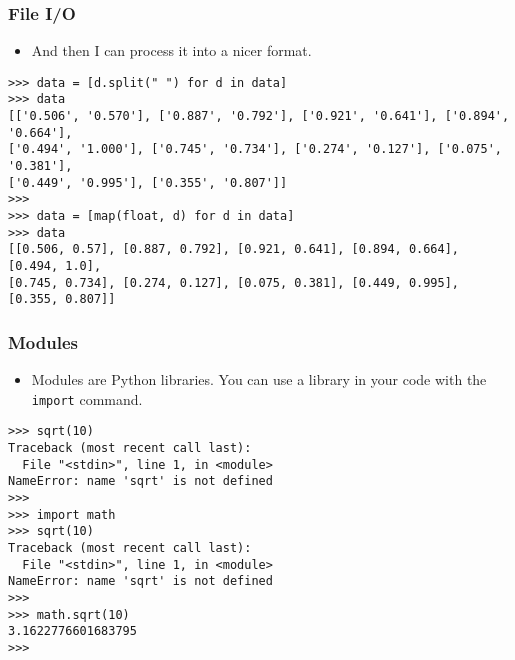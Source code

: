\documentclass[handout]{beamer}
\numberwithin{equation}{section}
\begin{document}
\begin{frame}[fragile]
\frametitle{File I/O}

\begin{itemize}
\item And then I can process it into a nicer format.
\end{itemize}

\begin{lstlisting}[name=ex]
>>> data = [d.split(" ") for d in data]
>>> data
[['0.506', '0.570'], ['0.887', '0.792'], ['0.921', '0.641'], ['0.894', '0.664'], 
['0.494', '1.000'], ['0.745', '0.734'], ['0.274', '0.127'], ['0.075', '0.381'], 
['0.449', '0.995'], ['0.355', '0.807']]
>>> 
>>> data = [map(float, d) for d in data]
>>> data
[[0.506, 0.57], [0.887, 0.792], [0.921, 0.641], [0.894, 0.664], [0.494, 1.0], 
[0.745, 0.734], [0.274, 0.127], [0.075, 0.381], [0.449, 0.995], [0.355, 0.807]]
\end{lstlisting}
\end{frame}


\begin{frame}[fragile]
\frametitle{Modules}

\begin{itemize}
\item Modules are Python libraries. You can use a library in your code with the {\tt import} command.
\end{itemize}

\begin{lstlisting}[name=ex]
>>> sqrt(10)
Traceback (most recent call last):
  File "<stdin>", line 1, in <module>
NameError: name 'sqrt' is not defined
>>> 
>>> import math
>>> sqrt(10)
Traceback (most recent call last):
  File "<stdin>", line 1, in <module>
NameError: name 'sqrt' is not defined
>>> 
>>> math.sqrt(10)
3.1622776601683795
>>> 
\end{lstlisting}
\end{frame}
\end{document}

